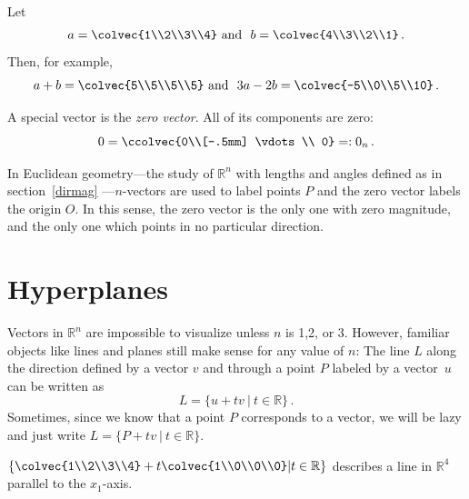 \begin{example}
Let 
\[a=\colvec{1\\2\\3\\4} \mbox{ and }\ b = \colvec{4\\3\\2\\1}\, .\]
Then, for example,
\[a+b= \colvec{5\\5\\5\\5} \mbox{ and }\  3a - 2b= \colvec{-5\\0\\5\\10}\, .\]
\end{example}



A special vector is the \emph{zero vector}. 
All of its components are zero:
\[
0=\ccolvec{0\\[-.5mm] \vdots \\ 0}=:0_n\, .
\]

In Euclidean geometry---the study of ${\mathbb R}^n$ with lengths and angles defined as in section~\ref{dirmag}
---$n$-vectors are used to label points  $P$ and the zero vector labels the origin $O$. In this sense,
  the zero vector is the only one  with zero magnitude, and the only one which points in no particular direction.  

\section{Hyperplanes}
Vectors in ${\mathbb R}^n$ are impossible to visualize unless $n$ is 1,2, or 3. However, familiar objects like lines and planes still make sense for any value of $n$:
The line $L$ along the direction defined by a vector $v$ and through a point $P$ labeled by a vector~$u$  can be written as 
\[L=\{ u + tv ~|~ t \in \mathbb{R} \}\, .\]  
Sometimes, since we know that a point $P$ corresponds to a vector,  we will be lazy and just write $L=\{P + tv ~|~ t \in \mathbb{R} \}$.  

\begin{example} %
$\left\{ \colvec{1\\2\\3\\4} + t\colvec{1\\0\\0\\0} \middle\vert t \in \mathbb{R} \right\}$ describes a line in ${\mathbb{R}}^4$ parallel to the $x_1$-axis.
\end{example}



